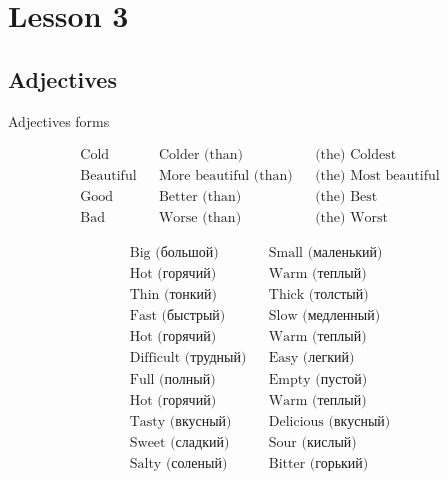 \documentclass{tstextbook}
\begin{document}
	
	
	\chapter{Lesson 3}
	
	\section{Adjectives}

	\begin{theorem} Adjectives forms
	\label{th: adj_forms}
	
		\begin{align*}
			\text{Cold} && \text{Colder (than)} && \text{(the) Coldest} \\
			\text{Beautiful} && \text{More beautiful (than)} && \text{(the) Most beautiful} \\
			\text{Good} && \text{Better (than)} && \text{(the) Best} \\
			\text{Bad} && \text{Worse (than)} && \text{(the) Worst}
		\end{align*}
	\end{theorem}

	\begin{example}
	\begin{align*}
		\text{Big (большой)} && \text{Small (маленький)} \\
		\text{Hot (горячий)} && \text{Warm (теплый)} \\
		\text{Thin (тонкий)} && \text{Thick (толстый)} \\
		\text{Fast (быстрый)} && \text{Slow (медленный)} \\
		\text{Hot (горячий)} && \text{Warm (теплый)} \\
		\text{Difficult (трудный)} && \text{Easy (легкий)} \\
		\text{Full (полный)} && \text{Empty (пустой)} \\
		\text{Hot (горячий)} && \text{Warm (теплый)} \\
		\text{Tasty (вкусный)} && \text{Delicious (вкусный)} \\
		\text{Sweet (сладкий)} && \text{Sour (кислый)} \\
		\text{Salty (соленый)} && \text{Bitter (горький)} \\
	\end{align*}
\end{example}
\end{document}
